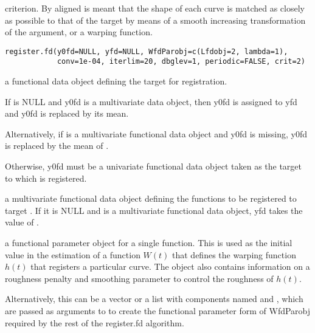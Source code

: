\begin{Description}\relax
criterion.  By aligned is meant that the shape of each curve is matched
as closely as possible to that of the target by means of a smooth
increasing transformation of the argument, or a warping function.
\end{Description}
\begin{Usage}
\begin{verbatim}
register.fd(y0fd=NULL, yfd=NULL, WfdParobj=c(Lfdobj=2, lambda=1),
            conv=1e-04, iterlim=20, dbglev=1, periodic=FALSE, crit=2)
\end{verbatim}
\end{Usage}
\begin{Arguments}
\begin{ldescription}
\item[\code{y0fd}] a functional data object defining the target for registration.

If  is NULL and y0fd is a multivariate data object, then
y0fd is assigned to yfd and y0fd is replaced by its mean.

Alternatively, if  is a multivariate functional data
object and y0fd is missing, y0fd is replaced by the mean of
.  

Otherwise, y0fd must be a univariate functional data object taken as
the target to which  is registered.  

\item[\code{yfd}] a multivariate functional data object defining the functions to be
registered to target .  If it is NULL and  is
a multivariate functional data object, yfd takes the value of 
.  

\item[\code{WfdParobj}] a functional parameter object for a single function.  This is used
as the initial value in the estimation of a function $W(t)$ that
defines the warping function $h(t)$ that registers a particular
curve. The object also contains information on a roughness penalty 
and smoothing parameter to control the roughness of $h(t)$.

Alternatively, this can be a vector or a list with components named
 and , which are passed as arguments to
 to create the functional parameter form of WfdParobj
required by the rest of the register.fd algorithm.


\end{ldescription}
\end{Arguments}
